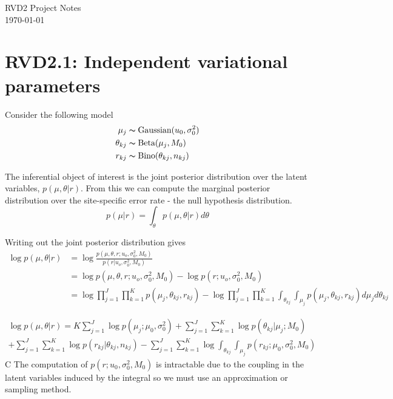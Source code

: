 \documentclass[10pt, letterpaper]{article}
\begin{document}
\linespread{1} %
\small \normalsize %
\begin{flushright}
RVD2 Project Notes \\
\today
\end{flushright}

\section*{RVD2.1: Independent variational parameters}

Consider the following model
\begin{align}
\mu_j &\thicksim \text{Gaussian}(u_0,\sigma^2_0)\\
\theta_{kj} &\thicksim \text{Beta}(\mu_j,M_0)\\
r_{kj} &\thicksim \text{Bino}(\theta_{kj}, n_{kj})
\end{align}

The inferential object of interest is the joint posterior distribution over the latent variables, $p(\mu,\theta|r)$. From this we can compute the marginal posterior distribution over the site-specific error rate - the null hypothesis distribution.
\begin{equation}
p(\mu|r) = \int_\theta p(\mu,\theta|r)d\theta
\end{equation}

Writing out the joint posterior distribution gives
\begin{equation}
\begin{split}
\log p(\mu,\theta | r)& = \log \frac{p(\mu,\theta,r;u_o,\sigma^2_0,M_0)}{p(r | u_o,\sigma^2_0,M_0)}\\
& = \log p(\mu,\theta,r;u_o,\sigma^2_0,M_0) - \log p(r ; u_o, \sigma^2_0,M_0)\\
& = \log \prod_{j=1}^J \prod_{k=1}^K p(\mu_j,\theta_{kj}, r_{kj}) - \log \prod_{j=1}^J \prod_{k=1}^K \int_{\theta_{kj}} \int_{\mu_j} p(\mu_j,\theta_{kj}, r_{kj})d\mu_jd\theta_{kj}
\end{split}
\end{equation}

\begin{multline}
\log p(\mu,\theta | r) = K\sum_{j=1}^J \log p(\mu_j;\mu_0,\sigma^2_0) 
	+\sum_{j=1}^J \sum_{k=1}^K \log p(\theta_{kj} | \mu_j;M_0)\\ 
	+\sum_{j=1}^J \sum_{k=1}^K\log p(r_{kj} | \theta_{kj}, n_{kj})
	- \sum_{j=1}^J \sum_{k=1}^K \log \int_{\theta_{kj}} \int_{\mu_j} p(r_{kj};\mu_0,\sigma^2_0,M_0) 
\end{multline}
C
The computation of $p(r;u_0,\sigma_0^2,M_0)$ is intractable due to the coupling in the latent variables induced by the integral so we must use an approximation or sampling method.
\end{document}
